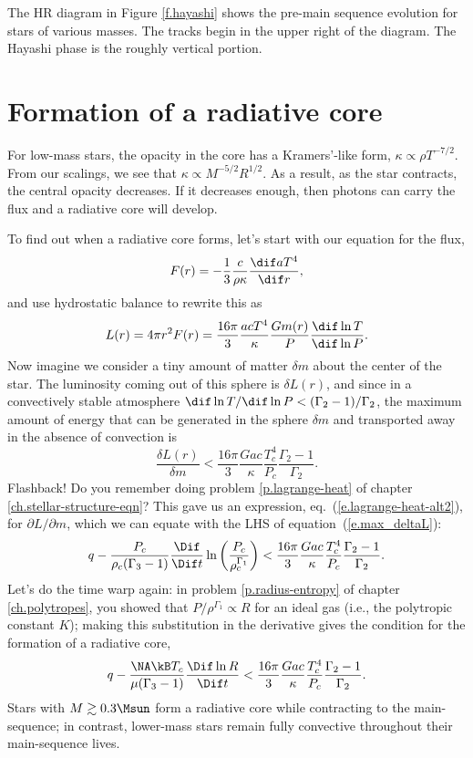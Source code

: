 The HR diagram in Figure \ref{f.hayashi} shows the pre-main sequence evolution for stars of various masses.
The tracks begin in the upper right of the diagram.
The Hayashi phase is the roughly vertical portion.


\section{Formation of a radiative core}

For low-mass stars, the opacity in the core has a Kramers'-like form, $\kappa \propto \rho T^{-7/2}$. From our scalings, we see that $\kappa \propto M^{-5/2} R^{1/2}$.  As a result, as the star contracts, the central opacity decreases.  If it decreases enough, then photons can carry the flux and a radiative core will develop.

To find out when a radiative core forms, let's start with our equation for the flux,
\[ F(r) = -\frac{1}{3}\frac{c}{\rho\kappa}\frac{\dif aT^{4}}{\dif r}, \]
and use hydrostatic balance to rewrite this as
\[ L(r) = 4\pi r^{2}F(r) = \frac{16\pi}{3}  \frac{acT^{4}}{\kappa} \frac{Gm(r)}{P} \frac{\dif \ln T}{\dif \ln P}. \]
Now imagine we consider a tiny amount of matter $\delta m$ about the center of the star.  The luminosity coming out of this sphere is $\delta L(r)$,  and since in a convectively stable atmosphere $\dif\ln T/\dif\ln P < (\Gamma_{2}-1)/\Gamma_{2}$, the maximum amount of energy that can be generated in the sphere $\delta m$ and transported away in the absence of convection is
\begin{equation}\label{e.max_deltaL}
  \frac{\delta L(r)}{\delta m} < \frac{16\pi}{3} \frac{Gac}{\kappa} \frac{T_{c}^{4}}{P_{c}}  \frac{\Gamma_{2}-1}{\Gamma_{2}}.
\end{equation}
Flashback! Do you remember doing problem \ref{p.lagrange-heat} of chapter \ref{ch.stellar-structure-eqn}? This gave us an expression, eq.~(\ref{e.lagrange-heat-alt2}), for $\partial L/\partial m$, which we can equate with the LHS of equation~(\ref{e.max_deltaL}):
\[
 q - \frac{P_{c}}{\rho_{c}(\Gamma_{3}-1)}\frac{\Dif }{\Dif t}\ln\left(\frac{P_{c}}{\rho_{c}^{\Gamma_{1}}}\right) <
 	\frac{16\pi}{3} \frac{Gac}{\kappa} \frac{T_{c}^{4}}{P_{c}}  \frac{\Gamma_{2}-1}{\Gamma_{2}}.
\]
Let's do the time warp again: in problem \ref{p.radius-entropy} of chapter \ref{ch.polytropes}, you showed that $P/\rho^{\Gamma_{1}} \propto R$ for an ideal gas (i.e., the polytropic constant $K$); making this substitution in the derivative gives the condition for the formation of a radiative core,
\begin{equation}\label{e.formation-radiative-core}
q - \frac{\NA\kB T_{c}}{\mu(\Gamma_{3}-1)} \frac{\Dif \ln R}{\Dif t} < \frac{16\pi}{3} \frac{Gac}{\kappa} \frac{T_{c}^{4}}{P_{c}}  \frac{\Gamma_{2}-1}{\Gamma_{2}}.
\end{equation}
Stars with $M \gtrsim 0.3 \Msun$ form a radiative core while contracting to the main-sequence; in contrast, lower-mass stars remain fully convective throughout their main-sequence lives.

